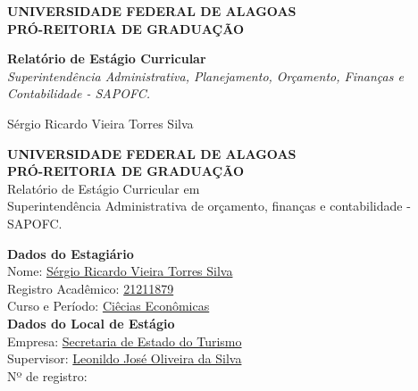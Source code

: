 \documentclass[12pt,a4paper]{article}
\begin{document}
	
	\begin{titlepage}
		\centering
		\large
		\textbf{UNIVERSIDADE FEDERAL DE ALAGOAS} \\
		\textbf{PRÓ-REITORIA DE GRADUAÇÃO} \\
		\vfill
		
		\Huge \textbf{Relatório de Estágio Curricular} \\
		\vspace{0.5cm}
		\LARGE \textit{Superintendência Administrativa, Planejamento, Orçamento, Finanças e Contabilidade - SAPOFC.} \\
		\vfill
		
		\Large Sérgio Ricardo Vieira Torres Silva \\
		\vspace{1.5cm}
	\end{titlepage}
	
	\thispagestyle{empty}
	\begin{center}
		\textbf{UNIVERSIDADE FEDERAL DE ALAGOAS} \\
		\textbf{PRÓ-REITORIA DE GRADUAÇÃO}\\
		\vspace{1cm}
		{Relatório de Estágio Curricular em}\\
		{Superintendência Administrativa de orçamento, finanças e contabilidade - SAPOFC.}
	\end{center}
	
	\vspace{1cm}
	
	\noindent \textbf{Dados do Estagiário} \\
	Nome: \underline{Sérgio Ricardo Vieira Torres Silva\hspace{0,2cm}} \\
	Registro Acadêmico: \underline{21211879\hspace{0,2cm}} \\
	Curso e Período: \underline{Ciêcias Econômicas\hspace{0,2cm}} \\
	
	\vspace{0.5cm}
	\noindent \textbf{Dados do Local de Estágio} \\
	Empresa: \underline{Secretaria de Estado do Turismo\hspace{0,2cm}} \\
	Supervisor: \underline{Leonildo José Oliveira da Silva\hspace{0,2cm}} \\
	Nº de registro: \underline{\hspace{0,2cm}} \\
	
\end{document}
